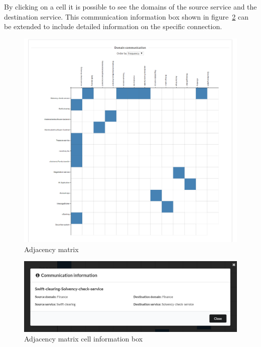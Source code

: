 By clicking on a cell it is possible to see the domains of the source service  and the destination service. This communication information box shown in figure~\ref{fig:pivio-visualizations-adjacency-matrix-cell} can be extended to include detailed information on the specific connection.

\begin{figure}[htpb]
  \centering
  \includegraphics[width=1.0\textwidth]{figures/pivio-visualizations-matrix.png}
  \caption{Adjacency matrix}
  \label{fig:pivio-visualizations-adjacency-matrix}
\end{figure}

\begin{figure}[htpb]
  \centering
  \includegraphics[width=1.0\textwidth]{figures/pivio-visualizations-matrix-cell.PNG}
  \caption{Adjacency matrix cell information box}
  \label{fig:pivio-visualizations-adjacency-matrix-cell}
\end{figure} 


